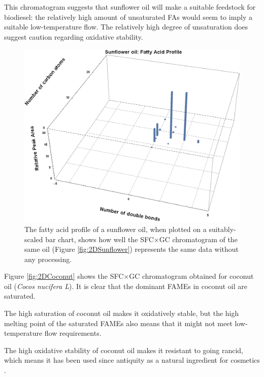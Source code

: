 This chromatogram suggests that sunflower oil will make a suitable feedstock for
biodiesel: the relatively high amount of unsaturated FAs would seem to imply a
suitable low-temperature flow. The relatively high degree of unsaturation does
suggest caution regarding oxidative stability.

\begin{figure}
\centering
\includegraphics[width=\textwidth]{Figures/BarChart.png}
\decoRule

\caption[3D Bar chart of fatty acid profile]{The fatty acid profile of a
sunflower oil, when plotted on a suitably-scaled bar chart, shows how well the
SFC×GC chromatogram of the same oil (Figure \ref{fig:2DSunflower}) represents
the same data without any processing.}

\label{fig:2DSunflowerBarChart}
\end{figure}

Figure \ref{fig:2DCoconut} shows the SFC×GC chromatogram obtained for coconut
oil (\textit{Cocos nucifera L}). It is clear that the dominant FAMEs in coconut
oil are saturated.

The high saturation of coconut oil makes it oxidatively stable, but the high
melting point of the saturated FAMEs also means that it might not meet
low-temperature flow requirements.

The high oxidative stability of coconut oil makes it resistant to going rancid,
which means it has been used since antiquity as a natural ingredient for cosmetics
\autocite{Berdick1972}.

